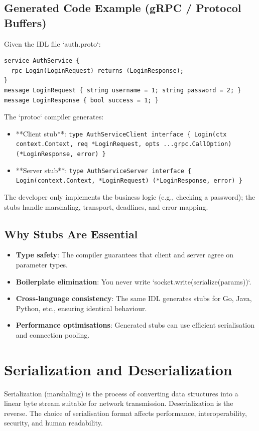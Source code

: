 \documentclass[a4paper]{article}
\begin{document}
\subsection{Generated Code Example (gRPC / Protocol Buffers)}
Given the IDL file `auth.proto`:
\begin{lstlisting}
service AuthService {
  rpc Login(LoginRequest) returns (LoginResponse);
}
message LoginRequest { string username = 1; string password = 2; }
message LoginResponse { bool success = 1; }
\end{lstlisting}
The `protoc` compiler generates:
\begin{itemize}
    \item **Client stub**:  
        \texttt{type AuthServiceClient interface \{ Login(ctx context.Context, req *LoginRequest, opts ...grpc.CallOption) (*LoginResponse, error) \}}
    \item **Server stub**:  
        \texttt{type AuthServiceServer interface \{ Login(context.Context, *LoginRequest) (*LoginResponse, error) \}}
\end{itemize}
The developer only implements the business logic (e.g., checking a password); the stubs handle marshaling, transport, deadlines, and error mapping.

\subsection{Why Stubs Are Essential}
\begin{itemize}
    \item \textbf{Type safety}: The compiler guarantees that client and server agree on parameter types.
    \item \textbf{Boilerplate elimination}: You never write `socket.write(serialize(params))`.
    \item \textbf{Cross-language consistency}: The same IDL generates stubs for Go, Java, Python, etc., ensuring identical behaviour.
    \item \textbf{Performance optimisations}: Generated stubs can use efficient serialisation and connection pooling.
\end{itemize}

\section{Serialization and Deserialization}
Serialization (marshaling) is the process of converting data structures into a linear byte stream suitable for network transmission. Deserialization is the reverse. The choice of serialisation format affects performance, interoperability, security, and human readability.
\end{document}
